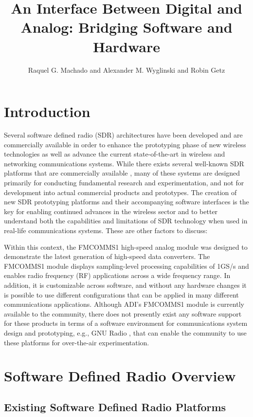 \documentclass{article}
\title{An Interface Between Digital and Analog: Bridging Software and Hardware}
\author{Raquel G. Machado and Alexander M. Wyglinski and Robin Getz}
\begin{document}
\maketitle

\section{Introduction}
Several software defined radio (SDR) \cite{mitola,sdr1,speakeasy} architectures have been developed and are commercially available in order to enhance the prototyping phase of new wireless technologies as well as advance the current state-of-the-art in wireless and networking communications systems. While there exists several well-known SDR platforms that are commercially available \cite{USRP,KUAR,Motorola,Maynooth,Rice}, many of these systems are designed primarily for conducting fundamental research and experimentation, and not for development into actual commercial products and prototypes. The creation of new SDR prototyping platforms and their accompanying software interfaces is the key for enabling continued advances in the wireless sector and to better understand both the capabilities and limitations of SDR technology when used in real-life communications systems. These are other factors to discuss: \cite{survey, hardware,path}

Within this context, the FMCOMMS1 high-speed analog module \cite{FMCOMMS} was designed to demonstrate the latest generation of high-speed data converters. The FMCOMMS1 module displays sampling-level processing capabilities of 1GS/s and enables radio frequency (RF) applications across a wide frequency range. In addition, it is customizable across software, and without any hardware changes it is possible to use different configurations that can be applied in many different communications applications. Although ADI's FMCOMMS1 module is currently available to the community, there does not presently exist any software support for these products in terms of a software environment for communications system design  and prototyping, e.g., GNU Radio \cite{GNU}, that can enable the community to use these platforms for over-the-air experimentation.

\section{Software Defined Radio Overview}

\subsection{Existing Software Defined Radio Platforms}
\end{document}
